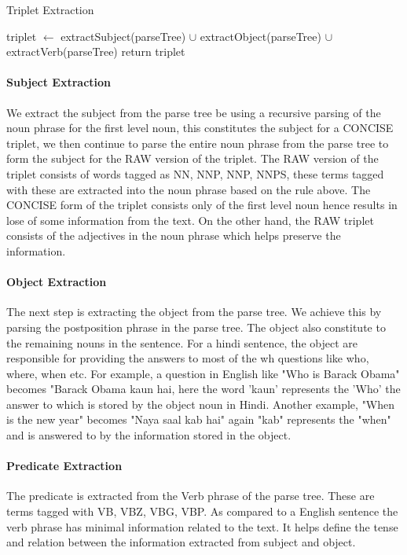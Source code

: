\begin {algorithm}
\caption {Triplet Extraction}
\begin {algorithmic}[1]
\State triplet $\gets$ extractSubject(parseTree) $\cup$ extractObject(parseTree) $\cup$ extractVerb(parseTree)
\State return triplet
\EndProcedure		
\end {algorithmic}
\end {algorithm}

\paragraph{Subject Extraction}
We extract the subject from the parse tree be using a recursive parsing of the noun phrase for the first level noun, this constitutes the subject for a CONCISE triplet, we then continue to parse the entire noun phrase from the parse tree to form the subject for the RAW version of the triplet. The RAW version of the triplet consists of words tagged as NN, NNP, NNP, NNPS, these terms tagged with these are extracted into the noun phrase based on the rule above. The CONCISE form of the triplet consists only of the first level noun hence results in lose of some information from the text. On the other hand, the RAW triplet consists of the adjectives in the noun phrase which helps preserve the information.

\paragraph{Object Extraction}
The next step is extracting the object from the parse tree. We achieve this by parsing the postposition phrase in the parse tree. The object also constitute to the remaining nouns in the sentence. For a hindi sentence, the object are responsible for providing the answers to most of the wh questions like who, where, when etc. For example, a question in English like "Who is Barack Obama"  becomes "Barack Obama kaun hai, here the word 'kaun' represents the 'Who' the answer to which is stored by the object noun in Hindi. Another example, "When is the new year" becomes "Naya saal kab hai" again "kab" represents the "when" and is answered to by the information stored in the object.

\paragraph{Predicate Extraction}
The predicate is extracted from the Verb phrase of the parse tree. These are terms tagged with VB, VBZ, VBG, VBP. As compared to a English sentence the verb phrase has minimal information related to the text. It helps define the tense and relation between the information extracted from subject and object.

